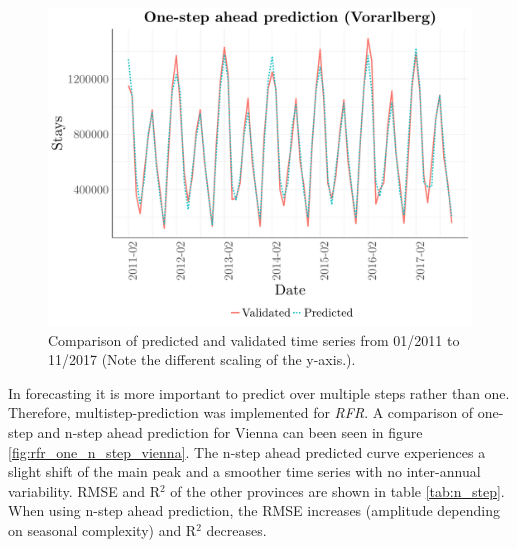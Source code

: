 \documentclass[a4paper,reqno,]{article}
\begin{document}
\begin{figure}[h!]
\begin{minipage}[h!]{0.33\textwidth}
    \includegraphics[width=1\textwidth]{images/RFR/Vorarlberg_one_step_ahead.pdf}
\end{minipage}
\caption{Comparison of predicted and validated time series from 01/2011 to 11/2017 (Note the different scaling of the y-axis.).}
\label{fig:rfr_onestep_comp}
\end{figure} 
\newpage
\noindent
In forecasting it is more important to predict over multiple steps rather than one. Therefore, multistep-prediction was implemented for \textit{RFR}. %
A comparison of one-step and n-step ahead prediction for Vienna can been seen in figure \ref{fig:rfr_one_n_step_vienna}. The n-step ahead predicted curve experiences a slight shift of the main peak and a smoother time series with no inter-annual variability. RMSE and R$^2$ of the other provinces are shown in table \ref{tab:n_step}. When using n-step ahead prediction, the RMSE increases (amplitude depending on seasonal complexity) and R$^2$ decreases. %
\newpage
\end{document}

